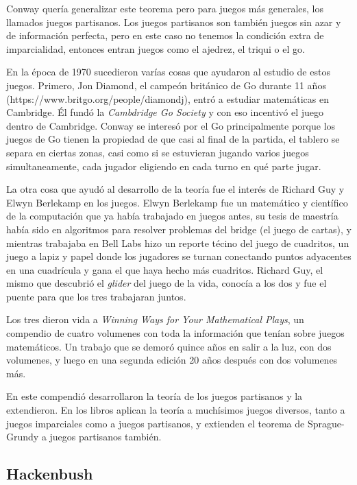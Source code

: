 Conway quer\'ia generalizar este teorema pero para juegos m\'as generales, los llamados juegos partisanos. Los juegos partisanos son tambi\'en juegos sin azar y de informaci\'on perfecta, pero en este caso no tenemos la condici\'on extra de imparcialidad, entonces entran juegos como el ajedrez, el triqui o el go.

En la \'epoca de 1970 sucedieron var\'ias cosas que ayudaron al estudio de estos juegos. Primero, Jon Diamond, el campe\'on brit\'anico de Go durante 11 a\~nos \cite{}(https://www.britgo.org/people/diamondj), entr\'o a estudiar matem\'aticas en Cambridge. \'El fund\'o la \textit{Cambdridge Go Society} y con eso incentiv\'o el juego dentro de Cambridge.
Conway se interes\'o por el Go principalmente porque los juegos de Go tienen la propiedad de que casi al final de la partida, el tablero se separa en ciertas zonas, casi como si se estuvieran jugando varios juegos simultaneamente, cada jugador eligiendo en cada turno en qu\'e parte jugar.

La otra cosa que ayud\'o al desarrollo de la teor\'ia fue el inter\'es de Richard Guy y Elwyn Berlekamp en los juegos. Elwyn Berlekamp fue un matem\'atico y cient\'ifico de la computaci\'on que ya hab\'ia trabajado en juegos antes, su tesis de maestr\'ia hab\'ia sido en algoritmos para resolver problemas del bridge (el juego de cartas), y mientras trabajaba en Bell Labs hizo un reporte t\'ecino del juego de cuadritos, un juego a lapiz y papel donde los jugadores se turnan conectando puntos adyacentes en una cuadr\'icula y gana el que haya hecho m\'as cuadritos. Richard Guy, el mismo que descubri\'o el \textit{glider} del juego de la vida, conoc\'ia a los dos y fue el puente para que los tres trabajaran juntos.

Los tres dieron vida a \textit{Winning Ways for Your Mathematical Plays}, un compendio de cuatro volumenes con toda la informaci\'on que ten\'ian sobre juegos matem\'aticos. Un trabajo que se demor\'o quince a\~nos en salir a la luz, con dos volumenes, y luego en una segunda edici\'on 20 a\~nos despu\'es con dos volumenes m\'as.

En este compendi\'o desarrollaron la teor\'ia de los juegos partisanos y la extendieron. En los libros aplican la teor\'ia a much\'isimos juegos diversos, tanto a juegos imparciales como a juegos partisanos, y extienden el teorema de Sprague-Grundy a juegos partisanos tambi\'en.

\subsection{Hackenbush}

